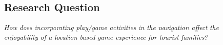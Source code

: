 \subsection{Research Question}
\emph{How does incorporating play/game activities in the navigation affect the enjoyability of a location-based game experience for tourist families?}